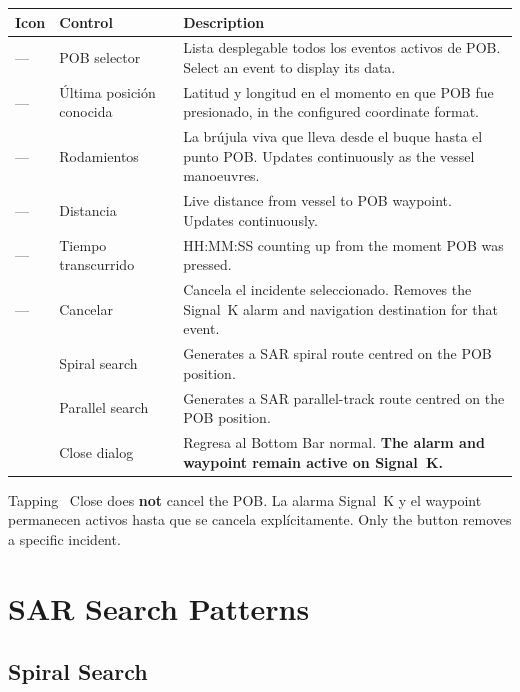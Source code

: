 \begin{longtable}{C{1.4cm}L{3.0cm}L{9.3cm}}
\toprule
{}
\color{white}\sffamily\bfseries Icon &
\color{white}\sffamily\bfseries Control &
\color{white}\sffamily\bfseries Description \\
\midrule
---                      &POB selector&
Lista desplegable todos los eventos activos de POB.
  Select an event to display its data. \\
---                      &Última posición conocida&
Latitud y longitud en el momento en que POB fue presionado,
  in the configured coordinate format. \\
---                      &Rodamientos&
La brújula viva que lleva desde el buque hasta el punto POB.
  Updates continuously as the vessel manoeuvres. \\
---                      &Distancia&
  Live distance from vessel to POB waypoint. Updates continuously. \\
---                      &Tiempo transcurrido&
  HH:MM:SS counting up from the moment POB was pressed. \\
---                      &Cancelar&
Cancela el incidente seleccionado.
  Removes the Signal~K alarm and navigation destination for that event. \\
   & Spiral search    &
  Generates a SAR spiral route centred on the POB position. \\
 & Parallel search  &
  Generates a SAR parallel-track route centred on the POB position. \\
    & Close dialog     &
Regresa al Bottom Bar normal.
  \textbf{The alarm and waypoint remain active on Signal~K.} \\
\bottomrule
\end{longtable}

\begin{warningbox}
Tapping ~Close does \textbf{not} cancel the POB.
La alarma Signal~K y el waypoint permanecen activos hasta que se cancela explícitamente.
Only the  button removes a specific incident.
\end{warningbox}

\section{SAR Search Patterns}

\subsection{Spiral Search}

